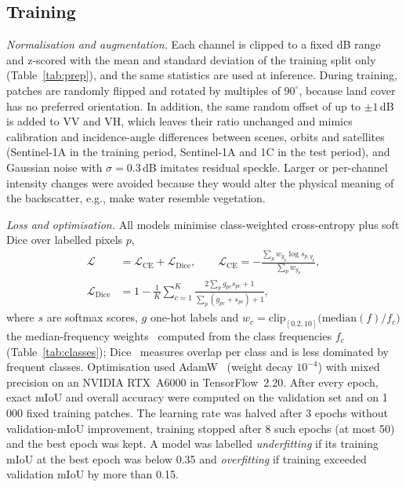 \documentclass[12pt,conference]{IEEEtran}
\begin{document}
\subsection{Training}

\textit{Normalisation and augmentation.} Each channel is clipped to a fixed dB range and z-scored with the mean and
standard deviation of the training split only (Table~\ref{tab:prep}), and the same statistics are used at inference.
During training, patches are randomly flipped and rotated by multiples of $90^\circ$, because land cover has no
preferred orientation. In addition, the same random offset of up to $\pm1$\,dB is added to VV and VH, which leaves
their ratio unchanged and mimics calibration and incidence-angle differences between scenes, orbits and satellites
(Sentinel-1A in the training period, Sentinel-1A and 1C in the test period), and Gaussian noise with
$\sigma=0.3$\,dB imitates residual speckle. Larger or per-channel intensity changes were avoided because they would
alter the physical meaning of the backscatter, e.g., make water resemble vegetation.

\textit{Loss and optimisation.} All models minimise class-weighted cross-entropy plus soft Dice over labelled pixels $p$,
\begin{align}
\mathcal{L}&=\mathcal{L}_{\mathrm{CE}}+\mathcal{L}_{\mathrm{Dice}},\qquad
\mathcal{L}_{\mathrm{CE}}=-\frac{\sum_p w_{y_p}\log s_{p,y_p}}{\sum_p w_{y_p}},\\
\mathcal{L}_{\mathrm{Dice}}&=1-\frac{1}{K}\sum_{c=1}^{K}\frac{2\sum_p g_{pc}s_{pc}+1}{\sum_p (g_{pc}+s_{pc})+1},
\end{align}
where $s$ are softmax scores, $g$ one-hot labels and $w_c=\mathrm{clip}_{[0.2,10]}\big(\mathrm{median}(f)/f_c\big)$ the
median-frequency weights~\cite{eigen2015predicting} computed from the class frequencies $f_c$ (Table~\ref{tab:classes});
Dice~\cite{milletari2016vnet} measures overlap per class and is less dominated by frequent classes. Optimisation used
AdamW~\cite{loshchilov2019decoupled} (weight decay $10^{-4}$) with mixed precision on an NVIDIA RTX~A6000 in
TensorFlow~2.20. After every epoch, exact mIoU and overall accuracy were computed on the validation set and on 1\,000
fixed training patches. The learning rate was halved after 3 epochs without validation-mIoU improvement, training
stopped after 8 such epochs (at most 50) and the best epoch was kept. A model was labelled \emph{underfitting} if its
training mIoU at the best epoch was below 0.35 and \emph{overfitting} if training exceeded validation mIoU by more
than 0.15.
\end{document}
